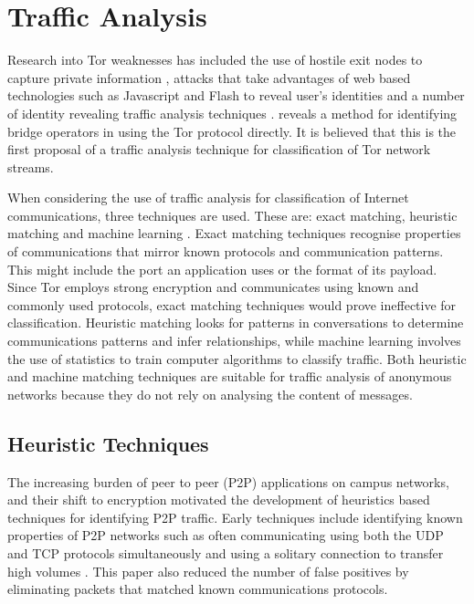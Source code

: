 \documentclass{ecuthesis}
\begin{document}
\section{Traffic Analysis}

Research into Tor weaknesses has included the use of hostile exit nodes to
capture private information \parencite{website:tor-password-leak}, attacks that
take advantages of web based technologies such as Javascript and Flash to reveal
user's identities \parencite{Abbott:2007p298} and a number of identity revealing
traffic analysis techniques
\parencite{Murdoch:2005p325,Abbott:2007p298,Evans:2009p315}.
\citeauthor{McLachlan:2009p197} reveals a method for identifying bridge
operators in \textcite{McLachlan:2009p197} using the Tor protocol directly.  It
is believed that this is the first proposal of a traffic analysis technique for
classification of Tor network streams.

When considering the use of traffic analysis for classification of Internet
communications, three techniques are used. These are: exact matching, heuristic
matching and machine learning \parencite{Zhang:2009p1188}. Exact matching
techniques recognise properties of communications that mirror known protocols
and communication patterns. This might include the port an application uses or
the format of its payload. Since Tor employs strong encryption and communicates
using known and commonly used protocols, exact matching techniques would prove
ineffective for classification. Heuristic matching looks for patterns in
conversations to determine communications patterns and infer relationships,
while machine learning involves the use of statistics to train computer
algorithms to classify traffic. Both heuristic and machine matching techniques
are suitable for traffic analysis of anonymous networks because they do not
rely on analysing the content of messages.

\subsection{Heuristic Techniques}

The increasing burden of peer to peer (P2P) applications on campus networks,
and their shift to encryption motivated the development of heuristics based
techniques for identifying P2P traffic. Early techniques include identifying
known properties of P2P networks such as often communicating using both the UDP
and TCP protocols simultaneously and using a solitary connection to transfer
high volumes \parencite{Karagiannis:2004p6400}. This paper also reduced the
number of false positives by eliminating packets that matched known
communications protocols.
\end{document}
